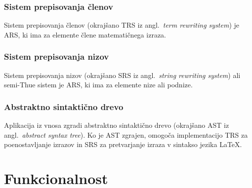 \documentclass[12pt]{report}
\newcommand{\anglimp}[1]{angl.~\emph{#1}}
\newcommand{\angokr}[2]{(okrajšano #1 iz \anglimp{#2})}
\begin{document}
		\subsection{Sistem prepisovanja členov}
			Sistem prepisovanja členov \angokr{TRS}{term rewriting system} je ARS, ki ima za elemente člene matematičnega izraza.
		\subsection{Sistem prepisovanja nizov}
			Sistem prepisovanja nizov \angokr{SRS}{string rewriting system} ali semi-Thue sistem je ARS, ki ima za elemente nize ali podnize.
		\subsection{Abstraktno sintaktično drevo}
			Aplikacija iz vnosa zgradi abstraktno sintaktično drevo \angokr{AST}{abstract syntax tree}.
			Ko je AST zgrajen, omogoča implementacijo TRS za poenostavljanje izrazov in SRS za pretvarjanje izraza v sintakso jezika \LaTeX{}.
\chapter{Funkcionalnost}
\label{features}
\end{document}
